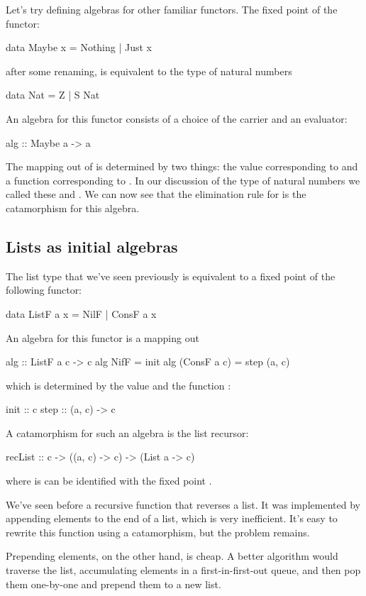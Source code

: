 \documentclass[DaoFP]{subfiles}
\begin{document}
Let's try defining algebras for other familiar functors. The fixed point of the  functor:
\begin{haskell}
data Maybe x = Nothing | Just x
\end{haskell}
after some renaming, is equivalent to the type of natural numbers
\begin{haskell}
data Nat = Z | S Nat
\end{haskell}
An algebra for this functor consists of a choice of the carrier  and an evaluator:
\begin{haskell}
alg :: Maybe a -> a
\end{haskell}
The mapping out of  is determined by two things: the value corresponding to  and a function  corresponding to . In our discussion of the type of natural numbers we called these  and . We can now see that the elimination rule for  is the catamorphism for this algebra.

\subsection{Lists as initial algebras}

The list type that we've seen previously is equivalent to a fixed point of the following functor:
\begin{haskell}
data ListF a x = NilF | ConsF a x
\end{haskell}
An algebra for this functor is a mapping out 
\begin{haskell}
alg :: ListF a c -> c
alg NifF = init
alg (ConsF a c) = step (a, c)
\end{haskell}
which is determined by the value  and the function :
\begin{haskell}
init :: c
step :: (a, c) -> c
\end{haskell}
A catamorphism for such an algebra is the list recursor:
\begin{haskell}
recList :: c -> ((a, c) -> c) -> (List a -> c)
\end{haskell}
where  is can be identified with the fixed point .

We've seen before a recursive function that reverses a list. It was implemented by appending elements to the end of a list, which is very inefficient. It's easy to rewrite this function using a catamorphism, but the problem remains. 

Prepending elements, on the other hand, is cheap. A better algorithm would traverse the list, accumulating elements in a first-in-first-out queue, and then pop them one-by-one and prepend them to a new list. 
\end{document}
